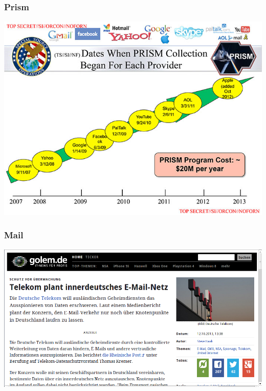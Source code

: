 \documentclass[12pt]{beamer}
\begin{document}
\subsection{}

\begin{frame}
    \frametitle{Prism}
    \includegraphics[height=0.7\textheight]{img/prism.jpg}
\end{frame}

\begin{frame}
    \frametitle{Mail}
    \includegraphics[height=0.7\textheight]{img/telekom_mail.png}
\end{frame}
\end{document}
